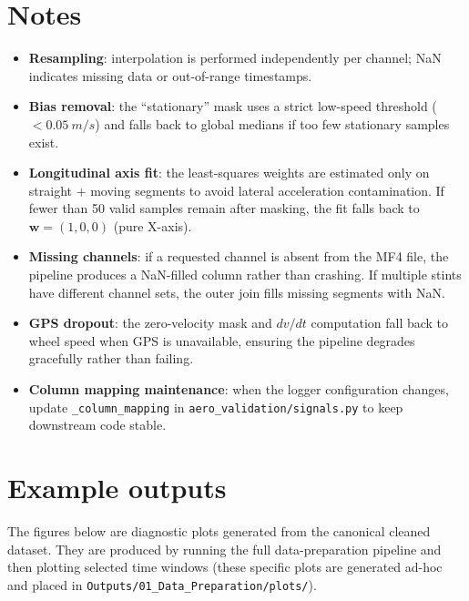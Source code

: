 \documentclass[11pt,a4paper]{article}
\begin{document}
\section{Notes}
\begin{itemize}
  \item \textbf{Resampling}: interpolation is performed independently per
        channel; NaN indicates missing data or out-of-range timestamps.
  \item \textbf{Bias removal}: the ``stationary'' mask uses a strict low-speed
        threshold ($<\SI{0.05}{m/s}$) and falls back to global medians if too
        few stationary samples exist.
  \item \textbf{Longitudinal axis fit}: the least-squares weights are estimated
        only on straight + moving segments to avoid lateral acceleration
        contamination.  If fewer than 50 valid samples remain after masking,
        the fit falls back to $\mathbf{w} = (1, 0, 0)$ (pure X-axis).
  \item \textbf{Missing channels}: if a requested channel is absent from the
        MF4 file, the pipeline produces a NaN-filled column rather than
        crashing.  If multiple stints have different channel sets, the outer
        join fills missing segments with NaN.
  \item \textbf{GPS dropout}: the zero-velocity mask and $dv/dt$ computation
        fall back to wheel speed when GPS is unavailable, ensuring the pipeline
        degrades gracefully rather than failing.
  \item \textbf{Column mapping maintenance}: when the logger configuration
        changes, update \texttt{\_column\_mapping} in
        \texttt{aero\_validation/signals.py} to keep downstream code stable.
\end{itemize}

\section{Example outputs}
The figures below are diagnostic plots generated from the canonical cleaned
dataset.  They are produced by running the full data-preparation pipeline and
then plotting selected time windows (these specific plots are generated ad-hoc
and placed in \texttt{Outputs/01\_Data\_Preparation/plots/}).
\end{document}
